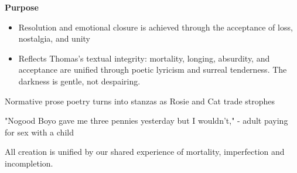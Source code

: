 	\textbf{Purpose}
	\begin{itemize}
		\item Resolution and emotional closure is achieved through the acceptance of loss, nostalgia, and unity
		\item Reflects Thomas's textual integrity: mortality, longing, absurdity, and acceptance are unified through poetic lyricism and surreal tenderness. The darkness is gentle, not despairing.
	\end{itemize}

	Normative prose poetry turns into stanzas as Rosie and Cat trade strophes

	"Nogood Boyo gave me three pennies yesterday but I wouldn’t," - adult paying for sex with a child

	All creation is unified by our shared experience of mortality, imperfection and incompletion.

